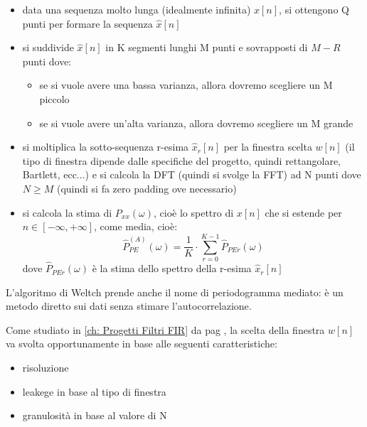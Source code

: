 \begin{itemize}
    \item data una sequenza molto lunga (idealmente infinita) $x \left[ n\right]$, si ottengono Q punti per formare la sequenza $\hat{x} \left[ n\right]$
    \item si suddivide $\hat{x} \left[ n\right]$ in K segmenti lunghi M punti e sovrapposti di $M - R$ punti dove: 
    \begin{itemize}
        \item se si vuole avere una bassa varianza, allora dovremo scegliere un M piccolo 
        \item se si vuole avere un'alta varianza, allora dovremo scegliere un M grande 
    \end{itemize}
    \item si moltiplica la sotto-sequenza r-esima $\hat{x}_{r} \left[ n\right]$ per la finestra scelta $w \left[ n\right]$ (il tipo di finestra dipende dalle specifiche del progetto, quindi rettangolare, Bartlett, ecc...) e si calcola la DFT (quindi si svolge la FFT) ad N punti dove $N \geq M$ (quindi si fa zero padding ove necessario) 
    \item si calcola la stima di $P_{xx} \left(\omega\right)$, cioè lo spettro di $x \left[ n\right]$ che si estende per $n \in \left[ - \infty, + \infty\right]$, come media, cioè:
    {
        \Large 
        \begin{equation}
            \hat{P}_{PE}^{\left(A\right)} \left(\omega\right)
            = 
            \dfrac{1}{K} 
            \cdot 
            \sum_{r = 0}^{K - 1}
            \hat{P}_{PEr} \left(\omega\right)
        \end{equation}
    }
    dove $\hat{P}_{PEr} \left(\omega\right)$ è la stima dello spettro della r-esima $\hat{x}_{r} \left[ n\right]$
\end{itemize}

L'algoritmo di Weltch prende anche il nome di periodogramma mediato: è un metodo diretto sui dati senza stimare l'autocorrelazione. \newline 

Come studiato in \ref{ch: Progetti Filtri FIR}  da pag \pageref{ch: Progetti Filtri FIR}, la scelta della finestra $w \left[ n\right]$ va svolta opportunamente in base alle seguenti caratteristiche: 

\begin{itemize}
    \item risoluzione 
    \item leakege in base al tipo di finestra 
    \item granulosità in base al valore di N
\end{itemize}

